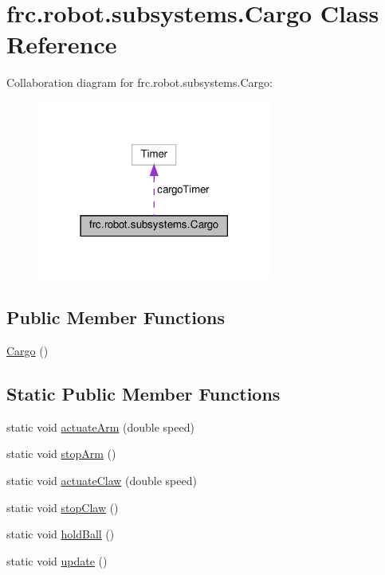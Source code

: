 \hypertarget{classfrc_1_1robot_1_1subsystems_1_1Cargo}{}\section{frc.\+robot.\+subsystems.\+Cargo Class Reference}
\label{classfrc_1_1robot_1_1subsystems_1_1Cargo}


Collaboration diagram for frc.\+robot.\+subsystems.\+Cargo\+:\nopagebreak
\begin{figure}[H]
\begin{center}
\leavevmode
\includegraphics[width=218pt]{classfrc_1_1robot_1_1subsystems_1_1Cargo__coll__graph}
\end{center}
\end{figure}
\subsection*{Public Member Functions}
\begin{DoxyCompactItemize}
\item 
\hyperlink{classfrc_1_1robot_1_1subsystems_1_1Cargo_ad27213bb1c8c9a33d5c2b9cc153c1508}{Cargo} ()
\end{DoxyCompactItemize}
\subsection*{Static Public Member Functions}
\begin{DoxyCompactItemize}
\item 
static void \hyperlink{classfrc_1_1robot_1_1subsystems_1_1Cargo_aa8640bc75e8b3f2472ea586936d6ed1f}{actuate\+Arm} (double speed)
\item 
static void \hyperlink{classfrc_1_1robot_1_1subsystems_1_1Cargo_aa85a0b3aa7cb498f4b1c7eac6d26bce2}{stop\+Arm} ()
\item 
static void \hyperlink{classfrc_1_1robot_1_1subsystems_1_1Cargo_aa05df516e815067a7b853d9fbdc35f01}{actuate\+Claw} (double speed)
\item 
static void \hyperlink{classfrc_1_1robot_1_1subsystems_1_1Cargo_a0ac97ff2fa2f7af96744a5dcba7ba61b}{stop\+Claw} ()
\item 
static void \hyperlink{classfrc_1_1robot_1_1subsystems_1_1Cargo_a8a4dd09c62967c4d82af8953cf8ab731}{hold\+Ball} ()
\item 
static void \hyperlink{classfrc_1_1robot_1_1subsystems_1_1Cargo_a20e8230acdc07d7d94e056f9e09d91ad}{update} ()
\end{DoxyCompactItemize}
